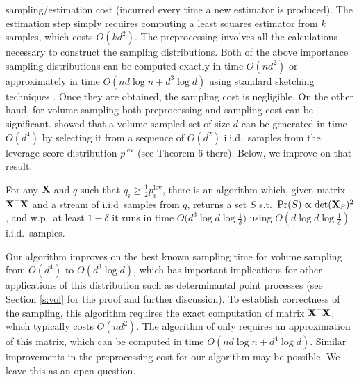 \documentclass[12pt]{sty/colt2019/colt2018-arxiv}
\begin{document}
sampling/estimation cost (incurred every time a new estimator is produced).
The estimation step simply requires computing a least squares estimator
from $k$ samples, which costs $O(kd^2)$. The
preprocessing involves all the calculations necessary to construct the
sampling distributions. Both of the above importance
sampling distributions can be computed exactly in time $O(nd^2)$ or
approximately in time $O(nd\log n +d^3\log d)$ using standard sketching
techniques \citep[see][]{DMMW12_JMLR}. Once they are obtained, the sampling cost is
negligible. On the other hand, for volume sampling both preprocessing
and sampling cost can be significant.
\cite{leveraged-volume-sampling} showed that a volume sampled set of size
$d$ can be generated in time $O(d^4)$ by selecting it from a sequence
of $O(d^2)$ i.i.d.~samples from the leverage score distribution
$p^{\mathrm{lev}}$ (see Theorem 6 there). Below, we improve on that result.
\begin{theorem}\label{t:bottom-up}
  For any $\mathbf X$ and $q$ such that $q_i\geq
  \frac12 p_i^{\mathrm{lev}}$, there is an algorithm which,
  given matrix $\X^\top\X$ and a stream of i.i.d~samples from
  $q$, returns a set $S$
  s.t.~$\mathrm{Pr}(S)\propto \det(\mathbf X_S)^2$, and w.p.~at least $1-\delta$
  it runs in time $O\big(d^3\log d \log\frac1\delta\big)$ using
  $O(d\log d\log\frac1\delta)$ i.i.d.~samples. 
\end{theorem}
Our algorithm improves on the best known sampling time for volume
sampling from $O(d^4)$ to $O(d^3\log d)$, which has important
implications for other applications of this distribution such as
determinantal point processes (see Section \ref{s:vol} for the proof
and further discussion). To establish correctness of the sampling,
this algorithm requires the exact computation of matrix $\X^\top\X$,
which typically costs $O(nd^2)$. The algorithm of
\cite{leveraged-volume-sampling} only requires an approximation of
this matrix, which can be computed in time $O(nd\log n + d^4\log d)$.
Similar improvements in the preprocessing cost for our algorithm may be possible. We leave this as an open question. 
\end{document}
